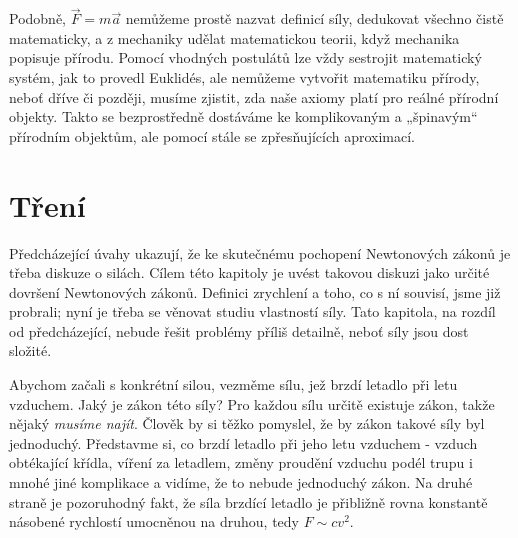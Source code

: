     Podobně, \(\vec{F}= m\vec{a}\) nemůžeme prostě nazvat definicí síly, dedukovat všechno čistě 
    matematicky, a z mechaniky udělat matematickou teorii, když mechanika popisuje přírodu. Pomocí 
    vhodných postulátů lze vždy sestrojit matematický systém, jak to provedl Euklidés, ale nemůžeme 
    vytvořit matematiku přírody, neboť dříve či později, musíme zjistit, zda naše axiomy platí pro 
    reálné přírodní objekty. Takto se bezprostředně dostáváme ke komplikovaným a „špinavým“ 
    přírodním objektům, ale pomocí stále se zpřesňujících aproximací.
    
  \section{Tření}\label{fyz:IchapXIIsecII}
    Předcházející úvahy ukazují, že ke skutečnému pochopení Newtonových zákonů je třeba diskuze o 
    silách. Cílem této kapitoly je uvést takovou diskuzi jako určité dovršení Newtonových zákonů. 
    Definici zrychlení a toho, co s ní souvisí, jsme již probrali; nyní je třeba se věnovat studiu 
    vlastností síly. Tato kapitola, na rozdíl od předcházející, nebude řešit problémy příliš 
    detailně, neboť síly jsou dost složité.
    
    Abychom začali s konkrétní silou, vezměme sílu, jež brzdí letadlo při letu vzduchem. Jaký je 
    zákon této síly? Pro každou sílu určitě existuje zákon, takže nějaký \emph{musíme najít}. 
    Člověk by si těžko pomyslel, že by zákon takové síly byl jednoduchý. Představme si, co brzdí 
    letadlo při jeho letu  vzduchem - vzduch obtékající křídla, víření za letadlem, změny proudění 
    vzduchu podél trupu i mnohé jiné komplikace a vidíme, že to nebude jednoduchý zákon. Na druhé 
    straně je pozoruhodný fakt, že síla brzdící letadlo je přibližně rovna konstantě násobené 
    rychlostí umocněnou na druhou, tedy \(F\sim cv^2\).
    
